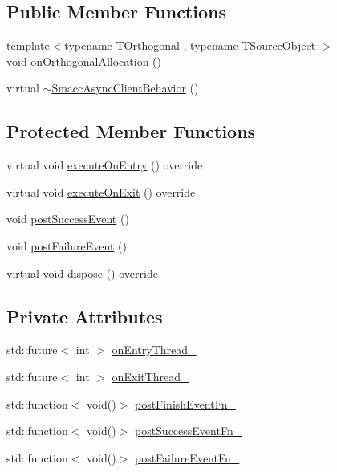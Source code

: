 \subsection*{Public Member Functions}
\begin{DoxyCompactItemize}
\item 
{\footnotesize template$<$typename T\+Orthogonal , typename T\+Source\+Object $>$ }\\void \hyperlink{classsmacc_1_1SmaccAsyncClientBehavior_a85bf707ed4fc349e0e35d89c9e78bc54}{on\+Orthogonal\+Allocation} ()
\item 
virtual \hyperlink{classsmacc_1_1SmaccAsyncClientBehavior_a0028345c409db6fdead7a16b23b9f0aa}{$\sim$\+Smacc\+Async\+Client\+Behavior} ()
\end{DoxyCompactItemize}
\subsection*{Protected Member Functions}
\begin{DoxyCompactItemize}
\item 
virtual void \hyperlink{classsmacc_1_1SmaccAsyncClientBehavior_ab8ca63d40d61554263466fe4c0b5cbd1}{execute\+On\+Entry} () override
\item 
virtual void \hyperlink{classsmacc_1_1SmaccAsyncClientBehavior_a3d982d370df4f133ad37c0b2370e9b82}{execute\+On\+Exit} () override
\item 
void \hyperlink{classsmacc_1_1SmaccAsyncClientBehavior_adf18efe1f0e4eacc1277b8865a8a94b1}{post\+Success\+Event} ()
\item 
void \hyperlink{classsmacc_1_1SmaccAsyncClientBehavior_af6fa358cb1ab5ed16791a201f59260e0}{post\+Failure\+Event} ()
\item 
virtual void \hyperlink{classsmacc_1_1SmaccAsyncClientBehavior_af475cee853947a8d3f513c7fb9789e7a}{dispose} () override
\end{DoxyCompactItemize}
\subsection*{Private Attributes}
\begin{DoxyCompactItemize}
\item 
std\+::future$<$ int $>$ \hyperlink{classsmacc_1_1SmaccAsyncClientBehavior_a6346e036a68f41c4397d7336f8519645}{on\+Entry\+Thread\+\_\+}
\item 
std\+::future$<$ int $>$ \hyperlink{classsmacc_1_1SmaccAsyncClientBehavior_af76d1c36b4a10425f2da043545b73299}{on\+Exit\+Thread\+\_\+}
\item 
std\+::function$<$ void()$>$ \hyperlink{classsmacc_1_1SmaccAsyncClientBehavior_af7a9ee952ba3fb8629aa55491606a7b2}{post\+Finish\+Event\+Fn\+\_\+}
\item 
std\+::function$<$ void()$>$ \hyperlink{classsmacc_1_1SmaccAsyncClientBehavior_a944ed10880796d53649bee39dc1299c0}{post\+Success\+Event\+Fn\+\_\+}
\item 
std\+::function$<$ void()$>$ \hyperlink{classsmacc_1_1SmaccAsyncClientBehavior_a8041c43a0381f18fae6470a98eb9273d}{post\+Failure\+Event\+Fn\+\_\+}
\end{DoxyCompactItemize}


